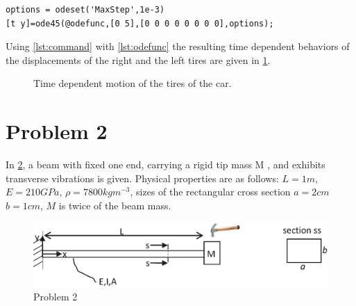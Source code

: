 \documentclass[]{report}
\begin{document}
\lstset{frame=single,numbers=left}
\begin{lstlisting}[label=lst:command,caption=integration commands]
options = odeset('MaxStep',1e-3)
[t y]=ode45(@odefunc,[0 5],[0 0 0 0 0 0 0 0],options);
\end{lstlisting}
\newpage
\lstset{frame=single,numbers=left}

Using \cref{lst:command} with \cref{lst:odefunc} the resulting time dependent behaviors of the displacements of the right and the left tires are given in \cref{fig:timedependenttires}.
\begin{figure}[ht!]
\centering

\caption{Time dependent motion of the tires of the car.}
\label{fig:timedependenttires}
\end{figure}

\section*{Problem 2}
In \cref{fig:problem2}, a beam  with fixed one end, carrying  a rigid tip mass M , and exhibits transverse vibrations is given. Physical properties are as follows:  $L =1m$, $E=210GPa$, $\rho=7800kgm^{-3}$, sizes of the rectangular cross section $a=2cm$ $b=1cm$, $M$ is twice of the beam mass.
\begin{figure}[ht!]
\centering
\includegraphics[width=\textwidth]{./Figures/2st_Assignment_2}
\caption{Problem 2}
\label{fig:problem2}
\end{figure}
\end{document}
